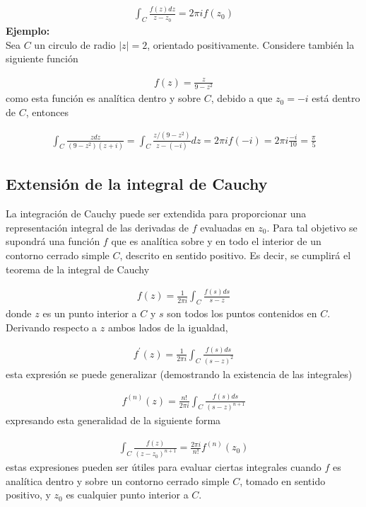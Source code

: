 \begin{gather*}
    \int_C \frac{f(z)dz}{z-z_0} = 2\pi if(z_0)
\end{gather*}
\textbf{Ejemplo:}\\
Sea $C$ un circulo de radio $|z| = 2$, orientado positivamente. Considere también la siguiente función

\begin{gather*}
    f(z) = \frac{z}{9 - z^2}
\end{gather*}
como esta función es analítica dentro y sobre $C$, debido a que $z_0 = -i$ está dentro de $C$, entonces

\begin{gather*}
    \int_C \frac{zdz}{(9-z^2)(z+i)} = \int_C \frac{z/(9 - z^2)}{z - (-i)}dz = 2\pi if(-i) = 2\pi i \frac{-i}{10} = \frac{\pi}{5}
\end{gather*}

\subsection{Extensión de la integral de Cauchy}
La integración de Cauchy puede ser extendida para proporcionar una representación integral de las derivadas de $f$ evaluadas en $z_0$. Para tal objetivo se supondrá una función $f$ que es analítica sobre y en todo el interior de un contorno cerrado simple $C$, descrito en sentido positivo. Es decir, se cumplirá el teorema de la integral de Cauchy

\begin{gather}
    f(z) = \frac{1}{2\pi i}\int_C \frac{f(s)ds}{s-z}
\end{gather}
donde $z$ es un punto interior a $C$ y $s$ son todos los puntos contenidos en $C$. Derivando respecto a $z$ ambos lados de la igualdad,

\begin{gather*}
    f^{\prime}(z) = \frac{1}{2\pi i}\int_C \frac{f(s)ds}{(s-z)^2}
\end{gather*}
esta expresión se puede generalizar (demostrando la existencia de las integrales)

\begin{gather*}
    f^{(n)}(z) = \frac{n!}{2\pi i}\int_C \frac{f(s)ds}{(s-z)^{n+1}}
\end{gather*}
expresando esta generalidad de la siguiente forma

\begin{gather}
    \int_C \frac{f(z)}{(z - z_0)^{n+1}} = \frac{2\pi i}{n!}f^{(n)}(z_0)
\end{gather}
estas expresiones pueden ser útiles para evaluar ciertas integrales cuando $f$ es analítica dentro y sobre un contorno cerrado simple $C$, tomado en sentido positivo, y $z_0$ es cualquier punto interior a $C$.